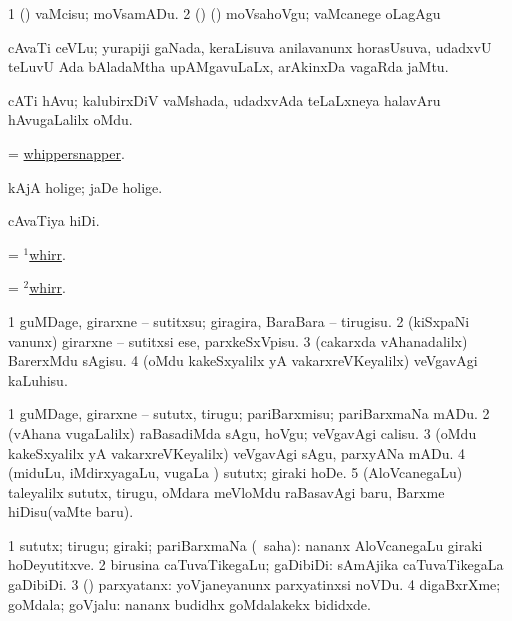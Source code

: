 \noindent
\gl{\akirx}
\expl{}
\bmng
\bnum
\num{1} (\AmA) vaMcisu; moVsamADu. 
\num{2} (\ame) (\ashi) moVsahoVgu; vaMcanege oLagAgu 
\enum
\emng
\eentry

\bentry 
{} 
\gl{\nA}
\expl{}
\bmng
cAvaTi ceVLu; yurapiji gaNada, keraLisuva anilavanunx horasUsuva, udadxvU teLuvU Ada bAladaMtha upAMgavuLaLx, arAkinxDa vagaRda jaMtu. 
\emng
\eentry

\bentry
{} 
\gl{\nA}
\expl{}
\bmng
cATi hAvu; kalubirxDiV vaMshada, udadxvAda teLaLxneya halavAru hAvugaLalilx oMdu. 
\emng
\eentry

\bentry
{} 
\gl{\nA}
\expl{}
\bmng
= \hyperlink{whippersnapper}{whippersnapper}. 
\emng
\eentry

\bentry
{} 
\gl{\nA}
\expl{}
\bmng
kAjA holige; jaDe holige. 
\emng
\eentry

\bentry
{} 
\gl{\nA}
\expl{}
\bmng
cAvaTiya hiDi. 
\emng
\eentry

\bentry
{} 
\gl{\akirx}
\expl{}
\bmng
= \hyperlink{whirr(1)}{$^1$whirr}. 
\emng
\eentry

\bentry
{} 
\gl{\nA}
\expl{}
\bmng
= \hyperlink{whirr(2)}{$^2$whirr}. 
\emng
\eentry

\bentry
{} 
\gl{\sakirx}
\expl{}
\bmng
\bnum
\num{1} guMDage, girarxne -- sutitxsu; giragira, BaraBara -- tirugisu. 
\num{2} (kiSxpaNi \mo vanunx) girarxne -- sutitxsi ese, parxkeSxVpisu. 
\num{3} (cakarxda vAhanadalilx) BarerxMdu sAgisu. 
\num{4} (oMdu kakeSxyalilx yA vakarxreVKeyalilx) veVgavAgi kaLuhisu. 
\enum
\emng

\noindent 
\gl{\akirx}
\expl{}
\bmng
\bnum
\num{1} guMDage, girarxne -- sututx, tirugu; pariBarxmisu; pariBarxmaNa mADu. 
\num{2} (vAhana \mo vugaLalilx) raBasadiMda sAgu, hoVgu; veVgavAgi calisu. 
\num{3} (oMdu kakeSxyalilx yA vakarxreVKeyalilx) veVgavAgi sAgu, parxyANa mADu. 
\num{4} (miduLu, iMdirxyagaLu, \mo vugaLa \vi) sututx; giraki hoDe. 
\num{5} (AloVcanegaLu) taleyalilx sututx, tirugu, oMdara meVloMdu raBasavAgi baru, Barxme hiDisu(vaMte baru). 
\enum
\emng
\eentry

\bentry
{} 
\gl{\nA}
\expl{}
\bmng
\bnum
\num{1} sututx; tirugu; giraki; pariBarxmaNa (\rUpa\ saha):  nananx AloVcanegaLu giraki hoDeyutitxve. 
\num{2} birusina caTuvaTikegaLu; gaDibiDi:  sAmAjika caTuvaTikegaLa gaDibiDi. 
\num{3} (\ashi) parxyatanx:  yoVjaneyanunx parxyatinxsi noVDu. 
\num{4} digaBxrXme; goMdala; goVjalu:  nananx budidhx goMdalakekx bididxde. 
\enum
\emng
\eentry

